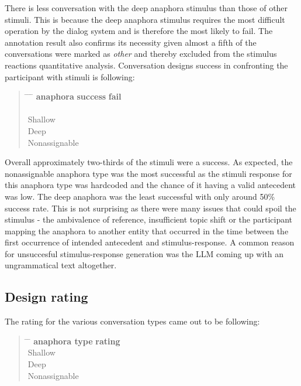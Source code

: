 There is less conversation with the deep anaphora stimulus than those of other stimuli.
This is because the deep anaphora stimulus requires the most difficult operation by the dialog system
and is therefore the most likely to fail.
The annotation result also confirms its necessity
given almost a fifth of the conversations were marked as \textit{other} and
thereby excluded from the stimulus reactions quantitative analysis.
Conversation designs success in confronting the participant with stimuli is following:

\begin{quote}
\begin{tabbing}
\hspace{4cm} \= \hspace{4cm} \=  \hspace{4cm} \= \kill %
        \textbf{anaphora} \> \textbf{success} \> \textbf{fail} \\
        {}   \\
        Shallow   \\
        Deep   \\
        Nonassignable   \\
    \end{tabbing}
    \end{quote}

Overall approximately two-thirds of the stimuli were a success. As
expected, the nonassignable anaphora type was the most successful as the
stimuli response for this anaphora type was hardcoded and the chance of it
having a valid antecedent was low. The deep anaphora was the least successful
with only around 50\% success rate. This is not surprising as there were
many issues that could spoil the stimulus - the ambivalence of reference,
insufficient topic shift or the participant mapping the anaphora to
another entity that occurred in the time between the first occurrence of
intended antecedent and stimulus-response.
A common reason for unsuccesful stimulus-response generation
was the LLM coming up with an ungrammatical text altogether.


\subsection{Design rating}

The rating for the various conversation types came out to be following:

\begin{quote}
\begin{tabbing}
\hspace{4cm} \= \hspace{4cm} \= \kill %
\textbf{anaphora type} \> \textbf{rating} \\
Shallow  \\
Deep  \\
Nonassignable  \\
\end{tabbing}
\end{quote}

